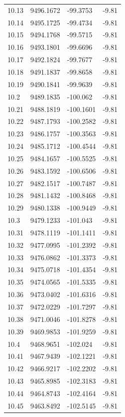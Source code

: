 \begin{table}[H]
\begin{tabular}{llll}
10.13 & 9496.1672 & -99.3753 & -9.81 \\
10.14 & 9495.1725 & -99.4734 & -9.81 \\
10.15 & 9494.1768 & -99.5715 & -9.81 \\
10.16 & 9493.1801 & -99.6696 & -9.81 \\
10.17 & 9492.1824 & -99.7677 & -9.81 \\
10.18 & 9491.1837 & -99.8658 & -9.81 \\
10.19 & 9490.1841 & -99.9639 & -9.81 \\
10.2 & 9489.1835 & -100.062 & -9.81 \\
10.21 & 9488.1819 & -100.1601 & -9.81 \\
10.22 & 9487.1793 & -100.2582 & -9.81 \\
10.23 & 9486.1757 & -100.3563 & -9.81 \\
10.24 & 9485.1712 & -100.4544 & -9.81 \\
10.25 & 9484.1657 & -100.5525 & -9.81 \\
10.26 & 9483.1592 & -100.6506 & -9.81 \\
10.27 & 9482.1517 & -100.7487 & -9.81 \\
10.28 & 9481.1432 & -100.8468 & -9.81 \\
10.29 & 9480.1338 & -100.9449 & -9.81 \\
10.3 & 9479.1233 & -101.043 & -9.81 \\
10.31 & 9478.1119 & -101.1411 & -9.81 \\
10.32 & 9477.0995 & -101.2392 & -9.81 \\
10.33 & 9476.0862 & -101.3373 & -9.81 \\
10.34 & 9475.0718 & -101.4354 & -9.81 \\
10.35 & 9474.0565 & -101.5335 & -9.81 \\
10.36 & 9473.0402 & -101.6316 & -9.81 \\
10.37 & 9472.0229 & -101.7297 & -9.81 \\
10.38 & 9471.0046 & -101.8278 & -9.81 \\
10.39 & 9469.9853 & -101.9259 & -9.81 \\
10.4 & 9468.9651 & -102.024 & -9.81 \\
10.41 & 9467.9439 & -102.1221 & -9.81 \\
10.42 & 9466.9217 & -102.2202 & -9.81 \\
10.43 & 9465.8985 & -102.3183 & -9.81 \\
10.44 & 9464.8743 & -102.4164 & -9.81 \\
10.45 & 9463.8492 & -102.5145 & -9.81 \\

\end{tabular}
\end{table}
